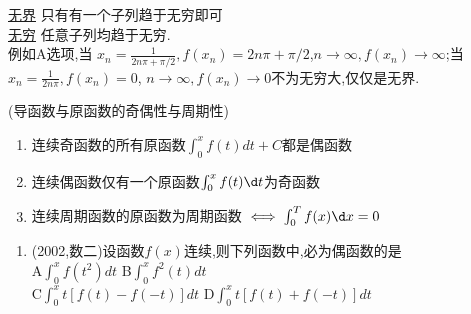\documentclass[12pt, a4paper, oneside, UTF8]{ctexbook}
\begin{document}
\begin{tcolorbox}[title=无穷VS无界]
    \underline{无界} 只有有一个子列趋于无穷即可 \\
    \underline{无穷} 任意子列均趋于无穷.  \\
    例如A选项,当 $x_n=\frac{1}{2n\pi+\pi/2},f(x_n)=2n\pi+\pi/2$,$n\to\infty,f(x_n)\to\infty$;当
    $x_n=\frac{1}{2n\pi},f(x_n)=0$, $n\to\infty,f(x_n)\to 0$不为无穷大,仅仅是无界.
\end{tcolorbox}
\begin{remark}(导函数与原函数的奇偶性与周期性)
    \begin{enumerate}
    \item 连续奇函数的所有原函数$\int_{0}^{x}f(t)dt+C$都是偶函数 

    \item 连续偶函数仅有一个原函数$\int_{0}^{x}f(t)\d t$为奇函数
    
    \item 连续周期函数的原函数为周期函数 $\iff\int_{0}^{T}f(x)\d x=0$
    \end{enumerate}
\end{remark}

\begin{enumerate}[label=\arabic*.,start=2]
    \item  (2002,数二)设函数$f(x)$连续,则下列函数中,必为偶函数的是 \\
    A\quad $\int_0^x f(t^2) dt$ \qquad\qquad
    B\quad $\int_0^x f^2(t) dt$ \\
    C\quad $\int_0^x t[f(t)-f(-t)] dt$ \qquad
    D\quad $\int_0^x t[f(t)+f(-t)] dt$

    
\end{enumerate}
\end{document}
